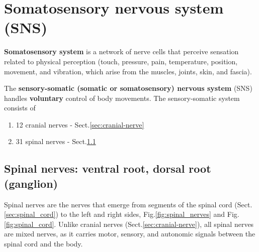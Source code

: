 \section{Somatosensory nervous system (SNS)}
\label{sec:somatic_nervous_system}
\label{sec:sensory-somatic-nervous-system}
\label{sec:somatosensory-system}

{\bf Somatosensory system} is a network of nerve cells that perceive sensation
related to physical perception (touch, pressure, pain, temperature, position,
movement, and vibration, which arise from the muscles, joints, skin, and fascia). 

The {\bf sensory-somatic (somatic or somatosensory) nervous system} (SNS) 
handles {\bf voluntary} control of body movements.  The sensory-somatic system
consists of
\begin{enumerate}
  \item 12 cranial nerves - Sect.\ref{sec:cranial-nerve}
  
  \item 31 spinal nerves - Sect.\ref{sec:spinal-nerve}
\end{enumerate}

\subsection{Spinal nerves: ventral root, dorsal root (ganglion)}
\label{sec:spinal-nerve}
\label{sec:dorsal-root}
\label{sec:ventral-root}

Spinal nerves are the nerves that emerge from segments of the spinal cord
(Sect.\ref{sec:spinal_cord}) to the left and right sides,
Fig.\ref{fig:spinal_nerves} and Fig.\ref{fig:spinal_cord}.
Unlike cranial nerves (Sect.\ref{sec:cranial-nerve}), all spinal nerves are
mixed nerves, as it carries motor, sensory, and autonomic signals between the
spinal cord and the body.

